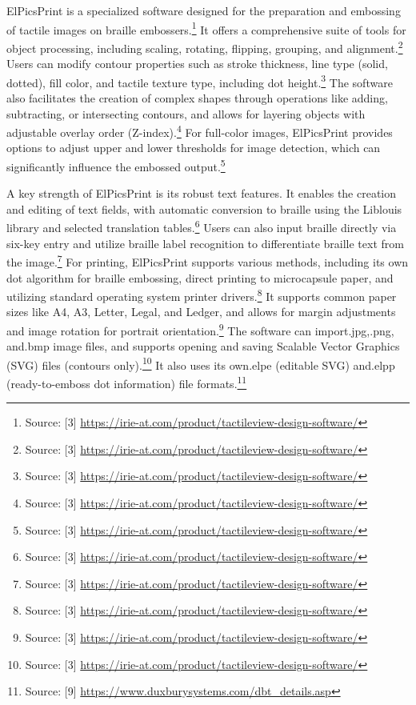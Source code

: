 ElPicsPrint is a specialized software designed for the preparation and embossing of tactile images on braille embossers.\footnote{Source: [3] \url{https://irie-at.com/product/tactileview-design-software/}} It offers a comprehensive suite of tools for object processing, including scaling, rotating, flipping, grouping, and alignment.\footnote{Source: [3] \url{https://irie-at.com/product/tactileview-design-software/}} Users can modify contour properties such as stroke thickness, line type (solid, dotted), fill color, and tactile texture type, including dot height.\footnote{Source: [3] \url{https://irie-at.com/product/tactileview-design-software/}} The software also facilitates the creation of complex shapes through operations like adding, subtracting, or intersecting contours, and allows for layering objects with adjustable overlay order (Z-index).\footnote{Source: [3] \url{https://irie-at.com/product/tactileview-design-software/}} For full-color images, ElPicsPrint provides options to adjust upper and lower thresholds for image detection, which can significantly influence the embossed output.\footnote{Source: [3] \url{https://irie-at.com/product/tactileview-design-software/}}

A key strength of ElPicsPrint is its robust text features. It enables the creation and editing of text fields, with automatic conversion to braille using the Liblouis library and selected translation tables.\footnote{Source: [3] \url{https://irie-at.com/product/tactileview-design-software/}} Users can also input braille directly via six-key entry and utilize braille label recognition to differentiate braille text from the image.\footnote{Source: [3] \url{https://irie-at.com/product/tactileview-design-software/}} For printing, ElPicsPrint supports various methods, including its own dot algorithm for braille embossing, direct printing to microcapsule paper, and utilizing standard operating system printer drivers.\footnote{Source: [3] \url{https://irie-at.com/product/tactileview-design-software/}} It supports common paper sizes like A4, A3, Letter, Legal, and Ledger, and allows for margin adjustments and image rotation for portrait orientation.\footnote{Source: [3] \url{https://irie-at.com/product/tactileview-design-software/}} The software can import.jpg,.png, and.bmp image files, and supports opening and saving Scalable Vector Graphics (SVG) files (contours only).\footnote{Source: [3] \url{https://irie-at.com/product/tactileview-design-software/}} It also uses its own.elpe (editable SVG) and.elpp (ready-to-emboss dot information) file formats.\footnote{Source: [9] \url{https://www.duxburysystems.com/dbt_details.asp}}

